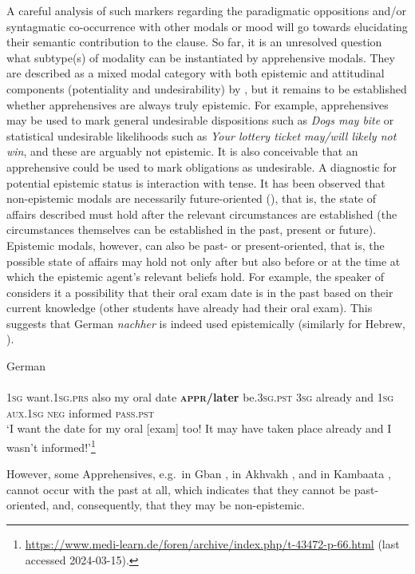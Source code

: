 \documentclass[output=paper,colorlinks,citecolor=brown
]{langscibook}
\begin{document}
A careful analysis of such markers regarding the paradigmatic oppositions and/or syntagmatic co-occurrence with other modals or mood will go towards elucidating their semantic contribution to the clause. So far, it is an unresolved question what subtype(s) of modality can be instantiated by apprehensive modals. They are described as a mixed modal category with both epistemic and attitudinal components (potentiality and undesirability) by \citet[293]{lichtenberk1995}, but it remains to be established whether apprehensives are always truly epistemic. For example, apprehensives may be used to mark general undesirable dispositions such as \textit{Dogs may bite} or statistical undesirable likelihoods such as \textit{Your lottery ticket may/will likely not win}, and these are arguably not epistemic. It is also conceivable that an apprehensive could be used to mark obligations as undesirable. A diagnostic for potential epistemic status is interaction with tense. It has been observed that non-epistemic modals are necessarily future-oriented (\cite{condoravdi2002,rullmannmatthewson2018}), that is, the state of affairs described must hold after the relevant circumstances are established (the circumstances themselves can be established in the past, present or future). Epistemic modals, however, can also be past- or present-oriented, that is, the possible state of affairs may hold not only after but also before or at the time at which the epistemic agent's relevant beliefs hold. For example, the speaker of  considers it a possibility that their oral exam date is in the past based on their current knowledge (other students have already had their oral exam). This suggests that German \textit{nachher} is indeed used epistemically (similarly for Hebrew, \citealt{chapters/francez}).

\ea \label{ex:intro20} \textnormal{German} \\
\\
\textsc{1sg} want.\textsc{1sg.prs} also my oral date 
\textsc{\textbf{appr/}}\textbf{later} be.\textsc{3sg.pst} \textsc{3sg} already and \textsc{1sg} \textsc{aux.1sg} \textsc{neg} informed \textsc{pass.pst} \\
\glt `I want the date for my oral [exam] too! It may have taken place already and I wasn't informed!'\footnote{\url{https://www.medi-learn.de/foren/archive/index.php/t-43472-p-66.html} (last accessed 2024-03-15).}
\z

 However, some Apprehensives, e.g.\  in Gban \citep{chapters/fedotov}, in Akhvakh \citep{chapters/daniel}, and in Kambaata \citep{chapters/treis}, cannot occur with the past at all, which indicates that they cannot be past-oriented, and, consequently, that they may be non-epistemic.
\end{document}
